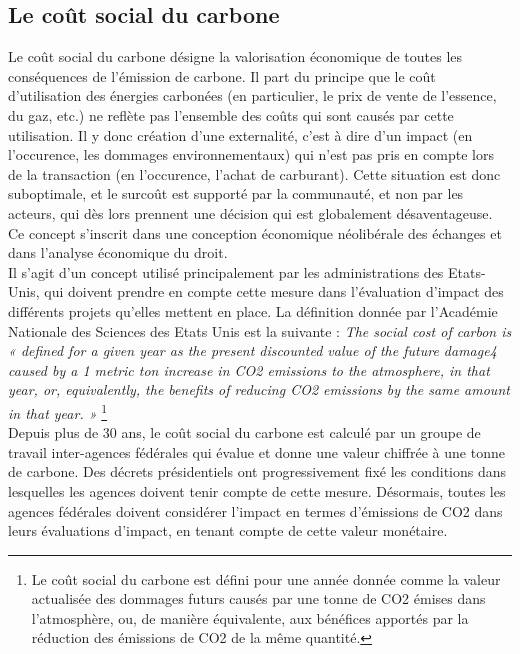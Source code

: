 \subsection{Le coût social du carbone}
\label{sect:1.3.2}

Le coût social du carbone désigne la valorisation économique de toutes les conséquences de l'émission de carbone. Il part du principe que le coût d'utilisation des énergies carbonées (en particulier, le prix de vente de l'essence, du gaz, etc.) ne reflète pas l'ensemble des coûts qui sont causés par cette utilisation. Il y donc création d'une externalité, c'est à dire d'un impact (en l'occurence, les dommages environnementaux) qui n'est pas pris en compte lors de la transaction (en l'occurence, l'achat de carburant). Cette situation est donc suboptimale, et le surcoût est supporté par la communauté, et non par les acteurs, qui dès lors prennent une décision qui est globalement désaventageuse. Ce concept s'inscrit dans une conception économique néolibérale des échanges et dans l'analyse économique du droit.  \\

Il s'agit d'un concept utilisé principalement par les administrations des Etats-Unis, qui doivent prendre en compte cette mesure dans l'évaluation d'impact des différents projets qu'elles mettent en place. La définition donnée par l'Académie Nationale des Sciences des Etats Unis est la suivante : \emph{The social cost of carbon is « defined for a given year as the present discounted value of the future damage4 caused by a 1 metric ton increase in CO2 emissions to the atmosphere, in that year, or, equivalently, the benefits of reducing CO2 emissions by the same amount in that year. » }\footnote{Le coût social du carbone est défini pour une année donnée comme la valeur actualisée des dommages futurs causés par une tonne de CO2 émises dans l'atmosphère, ou, de manière équivalente, aux bénéfices apportés par la réduction des émissions de CO2 de la même quantité.} \\

Depuis plus de 30 ans, le coût social du carbone est calculé par un groupe de travail inter-agences fédérales qui évalue et donne une valeur chiffrée à une tonne de carbone. Des décrets présidentiels ont progressivement fixé les conditions dans lesquelles les agences doivent tenir compte de cette mesure. Désormais, toutes les agences fédérales doivent considérer l'impact en termes d’émissions de CO2 dans leurs évaluations d'impact, en tenant compte de cette valeur monétaire. \\

